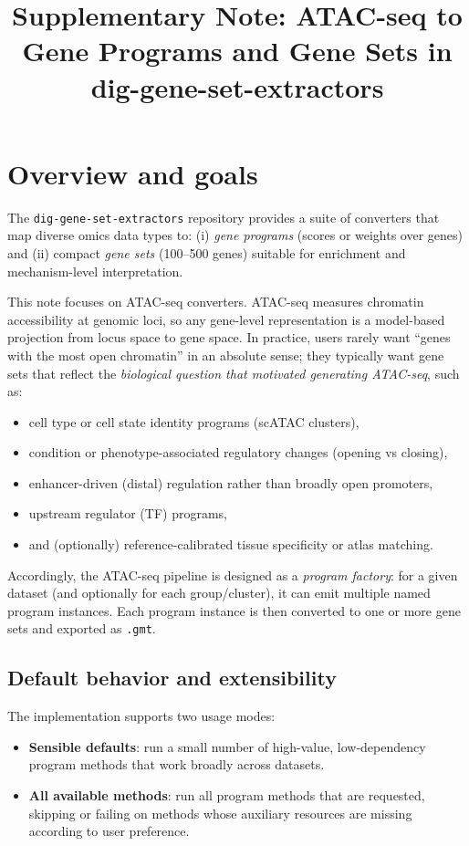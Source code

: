 \documentclass[11pt]{article}
\title{Supplementary Note: ATAC-seq to Gene Programs and Gene Sets in dig-gene-set-extractors}
\author{}
\date{}
\begin{document}
\maketitle

\section*{Overview and goals}
The \texttt{dig-gene-set-extractors} repository provides a suite of converters that map diverse omics data types to:
(i) \emph{gene programs} (scores or weights over genes) and
(ii) compact \emph{gene sets} (100--500 genes) suitable for enrichment and mechanism-level interpretation.

This note focuses on ATAC-seq converters. ATAC-seq measures chromatin accessibility at genomic loci, so any gene-level representation is a model-based projection from locus space to gene space. In practice, users rarely want ``genes with the most open chromatin'' in an absolute sense; they typically want gene sets that reflect the \emph{biological question that motivated generating ATAC-seq}, such as:
\begin{itemize}[leftmargin=2em]
\item cell type or cell state identity programs (scATAC clusters),
\item condition or phenotype-associated regulatory changes (opening vs closing),
\item enhancer-driven (distal) regulation rather than broadly open promoters,
\item upstream regulator (TF) programs,
\item and (optionally) reference-calibrated tissue specificity or atlas matching.
\end{itemize}

Accordingly, the ATAC-seq pipeline is designed as a \emph{program factory}: for a given dataset (and optionally for each group/cluster), it can emit multiple named program instances. Each program instance is then converted to one or more gene sets and exported as \texttt{.gmt}.

\subsection*{Default behavior and extensibility}
The implementation supports two usage modes:
\begin{itemize}[leftmargin=2em]
\item \textbf{Sensible defaults}: run a small number of high-value, low-dependency program methods that work broadly across datasets.
\item \textbf{All available methods}: run all program methods that are requested, skipping or failing on methods whose auxiliary resources are missing according to user preference.
\end{itemize}
\end{document}
